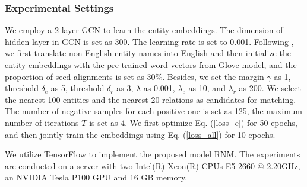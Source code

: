 \documentclass[letterpaper]{article} %
\begin{document}
\subsubsection{Experimental Settings}

We employ a 2-layer GCN to learn the entity embeddings. The
dimension of hidden layer in GCN is set as 300. The learning rate is
set to 0.001. Following \cite{wu2020neighborhood}, we first translate 
non-English entity names into English and then
initialize the entity embeddings with the pre-trained word vectors
from Glove model, and the proportion of seed alignments is set as
30\%. Besides, we set the margin $\gamma$ as 1, threshold $\delta_e$
as 5, threshold $\delta_r$ as 3, $\lambda$ as 0.001, $\lambda_e$ as
10, and $\lambda_r$ as 200. We select the nearest 100 entities and
the nearest 20 relations as candidates for matching. The
number of negative samples for each positive one is set as 125, the
maximum number of iterations $T$ is set as 4. We first optimize Eq.
(\ref{loss_e}) for 50 epochs, and then jointly train the embeddings using 
Eq. (\ref{loss_all}) for 10 epochs.

We utilize TensorFlow to implement the proposed model RNM. The
experiments are conducted on a server with two Intel(R) Xeon(R) CPUs
E5-2660 @ 2.20GHz, an NVIDIA Tesla P100 GPU and 16 GB memory.
\end{document}
